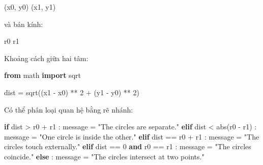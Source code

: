 \documentclass[
  11pt,
  a4paper,
]{article}
\newenvironment{Shaded}{}{}
\newcommand{\BuiltInTok}[1]{\textcolor[rgb]{0.00,0.50,0.00}{#1}}
\newcommand{\ControlFlowTok}[1]{\textcolor[rgb]{0.00,0.44,0.13}{\textbf{#1}}}
\newcommand{\DecValTok}[1]{\textcolor[rgb]{0.25,0.63,0.44}{#1}}
\newcommand{\ImportTok}[1]{\textcolor[rgb]{0.00,0.50,0.00}{\textbf{#1}}}
\newcommand{\KeywordTok}[1]{\textcolor[rgb]{0.00,0.44,0.13}{\textbf{#1}}}
\newcommand{\NormalTok}[1]{#1}
\newcommand{\OperatorTok}[1]{\textcolor[rgb]{0.40,0.40,0.40}{#1}}
\newcommand{\StringTok}[1]{\textcolor[rgb]{0.25,0.44,0.63}{#1}}
\begin{document}
\begin{Shaded}
\begin{Highlighting}[]
\NormalTok{(x0, y0)}
\NormalTok{(x1, y1)}
\end{Highlighting}
\end{Shaded}

và bán kính:

\begin{Shaded}
\begin{Highlighting}[]
\NormalTok{r0}
\NormalTok{r1}
\end{Highlighting}
\end{Shaded}

Khoảng cách giữa hai tâm:

\begin{Shaded}
\begin{Highlighting}[]
\ImportTok{from}\NormalTok{ math }\ImportTok{import}\NormalTok{ sqrt}

\NormalTok{dist }\OperatorTok{=}\NormalTok{ sqrt((x1 }\OperatorTok{{-}}\NormalTok{ x0) }\OperatorTok{**} \DecValTok{2} \OperatorTok{+}\NormalTok{ (y1 }\OperatorTok{{-}}\NormalTok{ y0) }\OperatorTok{**} \DecValTok{2}\NormalTok{)}
\end{Highlighting}
\end{Shaded}

Có thể phân loại quan hệ bằng rẽ nhánh:

\begin{Shaded}
\begin{Highlighting}[]
\ControlFlowTok{if}\NormalTok{ dist }\OperatorTok{\textgreater{}}\NormalTok{ r0 }\OperatorTok{+}\NormalTok{ r1 :}
\NormalTok{    message }\OperatorTok{=} \StringTok{"The circles are separate."}
\ControlFlowTok{elif}\NormalTok{ dist }\OperatorTok{\textless{}} \BuiltInTok{abs}\NormalTok{(r0 }\OperatorTok{{-}}\NormalTok{ r1) :}
\NormalTok{    message }\OperatorTok{=} \StringTok{"One circle is inside the other."}
\ControlFlowTok{elif}\NormalTok{ dist }\OperatorTok{==}\NormalTok{ r0 }\OperatorTok{+}\NormalTok{ r1 :}
\NormalTok{    message }\OperatorTok{=} \StringTok{"The circles touch externally."}
\ControlFlowTok{elif}\NormalTok{ dist }\OperatorTok{==} \DecValTok{0} \KeywordTok{and}\NormalTok{ r0 }\OperatorTok{==}\NormalTok{ r1 :}
\NormalTok{    message }\OperatorTok{=} \StringTok{"The circles coincide."}
\ControlFlowTok{else}\NormalTok{ :}
\NormalTok{    message }\OperatorTok{=} \StringTok{"The circles intersect at two points."}
\end{Highlighting}
\end{Shaded}
\end{document}
